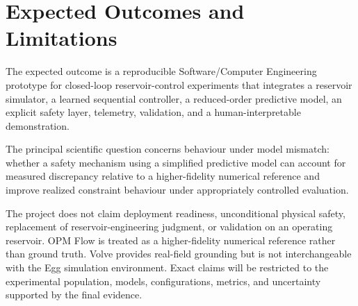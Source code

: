 \section{Expected Outcomes and Limitations}
\label{sec:outcomes}

The expected outcome is a reproducible Software/Computer Engineering prototype for
closed-loop reservoir-control experiments that integrates a reservoir simulator, a
learned sequential controller, a reduced-order predictive model, an explicit safety
layer, telemetry, validation, and a human-interpretable demonstration.

The principal scientific question concerns behaviour under model mismatch: whether a
safety mechanism using a simplified predictive model can account for measured
discrepancy relative to a higher-fidelity numerical reference and improve realized
constraint behaviour under appropriately controlled evaluation.

The project does not claim deployment readiness, unconditional physical safety,
replacement of reservoir-engineering judgment, or validation on an operating
reservoir. OPM Flow is treated as a higher-fidelity numerical reference rather than
ground truth. Volve provides real-field grounding but is not interchangeable with the
Egg simulation environment. Exact claims will be restricted to the experimental
population, models, configurations, metrics, and uncertainty supported by the final
evidence.
